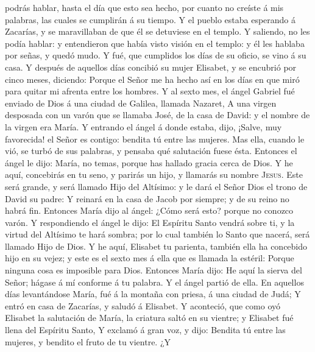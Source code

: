 podrás hablar, hasta el día que esto sea hecho, por cuanto no creíste á
mis palabras, las cuales se cumplirán á su tiempo.  Y el
pueblo estaba esperando á Zacarías, y se maravillaban de que él se
detuviese en el templo.  Y saliendo, no les podía hablar:
y entendieron que había visto visión en el templo: y él les hablaba por
señas, y quedó mudo.  Y fué, que cumplidos los días de su
oficio, se vino á su casa.  Y después de aquellos días
concibió su mujer Elisabet, y se encubrió por cinco meses, diciendo:
 Porque el Señor me ha hecho así en los días en que miró
para quitar mi afrenta entre los hombres.  Y al sexto
mes, el ángel Gabriel fué enviado de Dios á una ciudad de Galilea,
llamada Nazaret,  A una virgen desposada con un varón que
se llamaba José, de la casa de David: y el nombre de la virgen era
María.  Y entrando el ángel á donde estaba, dijo, ¡Salve,
muy favorecida! el Señor es contigo: bendita tú entre las mujeres.
 Mas ella, cuando le vió, se turbó de sus palabras, y
pensaba qué salutación fuese ésta.  Entonces el ángel le
dijo: María, no temas, porque has hallado gracia cerca de Dios.
 Y he aquí, concebirás en tu seno, y parirás un hijo, y
llamarás su nombre \textsc{Jesus}.  Este será grande, y
será llamado Hijo del Altísimo: y le dará el Señor Dios el trono de
David su padre:  Y reinará en la casa de Jacob por
siempre; y de su reino no habrá fin.  Entonces María dijo
al ángel: ¿Cómo será esto? porque no conozco varón.  Y
respondiendo el ángel le dijo: El Espíritu Santo vendrá sobre ti, y la
virtud del Altísimo te hará sombra; por lo cual también lo Santo que
nacerá, será llamado Hijo de Dios.  Y he aquí, Elisabet
tu parienta, también ella ha concebido hijo en su vejez; y este es el
sexto mes á ella que es llamada la estéril:  Porque
ninguna cosa es imposible para Dios.  Entonces María
dijo: He aquí la sierva del Señor; hágase á mí conforme á tu palabra. Y
el ángel partió de ella.  En aquellos días levantándose
María, fué á la montaña con priesa, á una ciudad de Judá;
 Y entró en casa de Zacarías, y saludó á Elisabet.
 Y aconteció, que como oyó Elisabet la salutación de
María, la criatura saltó en su vientre; y Elisabet fué llena del
Espíritu Santo,  Y exclamó á gran voz, y dijo: Bendita tú
entre las mujeres, y bendito el fruto de tu vientre.  ¿Y
